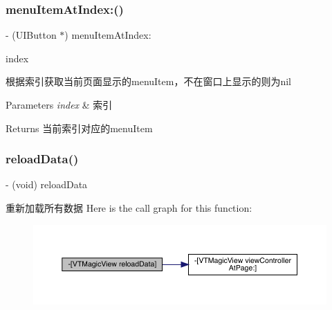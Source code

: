 \subsubsection{\texorpdfstring{menu\+Item\+At\+Index\+:()}{menuItemAtIndex:()}\hspace{0.1cm}{\footnotesize\ttfamily [3/3]}}
{\footnotesize\ttfamily -\/ (U\+I\+Button $\ast$) menu\+Item\+At\+Index\+: \begin{DoxyParamCaption}\item[{(N\+S\+U\+Integer)}]{index }\end{DoxyParamCaption}}

根据索引获取当前页面显示的menu\+Item，不在窗口上显示的则为nil


\begin{DoxyParams}{Parameters}
{\em index} & 索引\\
\hline
\end{DoxyParams}
\begin{DoxyReturn}{Returns}
当前索引对应的menu\+Item 
\end{DoxyReturn}
\mbox{\label{interface_v_t_magic_view_a2b4be574c1455324b75320267d6a570b}} 
\subsubsection{\texorpdfstring{reload\+Data()}{reloadData()}\hspace{0.1cm}{\footnotesize\ttfamily [1/3]}}
{\footnotesize\ttfamily -\/ (void) reload\+Data \begin{DoxyParamCaption}{ }\end{DoxyParamCaption}}

重新加载所有数据 Here is the call graph for this function\+:\nopagebreak
\begin{figure}[H]
\begin{center}
\leavevmode
\includegraphics[width=350pt]{interface_v_t_magic_view_a2b4be574c1455324b75320267d6a570b_cgraph}
\end{center}
\end{figure}
\mbox{\label{interface_v_t_magic_view_a2b4be574c1455324b75320267d6a570b}} 
